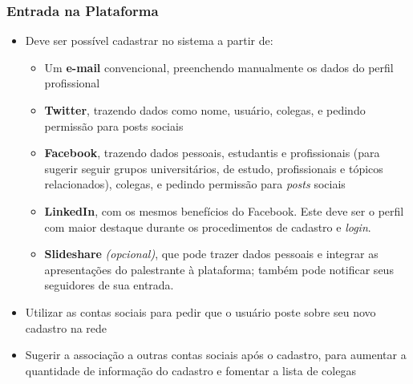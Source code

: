 \documentclass[12pt,a4paper,twoside,hyphens,english,brazil]{abntex2}
\begin{document}
\subsubsection*{Entrada na Plataforma}
\begin{itemize}
\item Deve ser possível cadastrar no sistema a partir de:
	\begin{itemize} %
		\item Um \textbf{e-mail} convencional, preenchendo manualmente os dados do perfil profissional
		\item \textbf{Twitter}, trazendo dados como nome, usuário, colegas, e pedindo permissão para posts sociais %
		\item \textbf{Facebook}, trazendo dados pessoais, estudantis e profissionais (para sugerir seguir grupos universitários, de estudo, profissionais e tópicos relacionados), colegas, e pedindo permissão para \emph{posts} sociais %
		\item \textbf{LinkedIn}, com os mesmos benefícios do Facebook. Este deve ser o perfil com maior destaque durante os procedimentos de cadastro e \emph{login}.
		\item \textbf{Slideshare} \textit{(opcional)}, que pode trazer dados pessoais e integrar as apresentações do palestrante à plataforma; também pode notificar seus seguidores de sua entrada.
	\end{itemize}
\item Utilizar as contas sociais para pedir que o usuário poste sobre seu novo cadastro na rede
\item Sugerir a associação a outras contas sociais após o cadastro, para aumentar a quantidade de informação do cadastro e fomentar a lista de colegas
\end{itemize}
\end{document}

